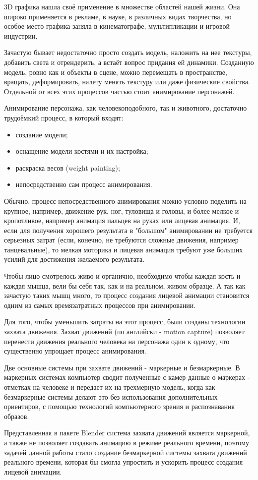 
3D графика нашла своё применение в множестве областей нашей жизни. Она широко применяется в рекламе, в науке, в различных видах творчества, но особое место графика заняла в кинематографе, мультипликации и игровой индустрии.
 
Зачастую бывает недостаточно просто создать модель, наложить на нее текстуры, добавить света и отрендерить, а встаёт вопрос придания ей динамики. Созданную модель, ровно как и объекты в сцене, можно перемещать в пространстве, вращать, деформировать, налету менять текстуру или даже физические свойства. Отдельной от всех этих процессов частью стоит анимирование персонажей.

Анимирование персонажа, как человекоподобного, так и животного, достаточно трудоёмкий процесс, в который входят:
\begin{itemize}
	\item создание модели;
	\item оснащение модели костями и их настройка;
	\item раскраска весов (weight painting);
	\item непосредственно сам процесс анимирования.
\end{itemize}

Обычно, процесс непосредственного анимирования можно условно поделить на крупное, например, движение рук, ног, туловища и головы, и более мелкое и кропотливое, например анимация пальцев на руках или лицевая анимация. И, если для получения хорошего результата в "большом" анимировании не требуется серьезных затрат (если, конечно, не требуются сложные движения, например танцевальные), то мелкая моторика и лицевая анимация требуют уже больших усилий для достижения желаемого результата.

Чтобы лицо смотрелось живо и органично, необходимо чтобы каждая кость и каждая мышца, вели бы себя так, как и на реальном, живом образце. А так как зачастую таких мышц много, то процесс создания лицевой анимации становится одним из самых времязатратных процессов при анимировании.

Для того, чтобы уменьшить затраты на этот процесс, были созданы технологии захвата движения. Захват движений (по английски - motion capture) позволяет перенести движения реального человека на персонажа один к одному, что существенно упрощает процесс анимирования.

Две основные системы при захвате движений - маркерные и безмаркерные. В маркерных системах компьютер сводит полученные с камер данные о маркерах - отметках на человеке и передает их на трехмерную модель, когда как безмаркерные системы делают это без использования дополнительных ориентиров, с помощью технологий компьютерного зрения и распознавания образов.

Представленная в пакете Blender система захвата движений является маркерной, а также не позволяет создавать анимацию в режиме реального времени, поэтому задачей данной работы стало создание безмаркерной системы захвата движений реального времени, которая бы смогла упростить и ускорить процесс создания лицевой анимации.




\clearpage
